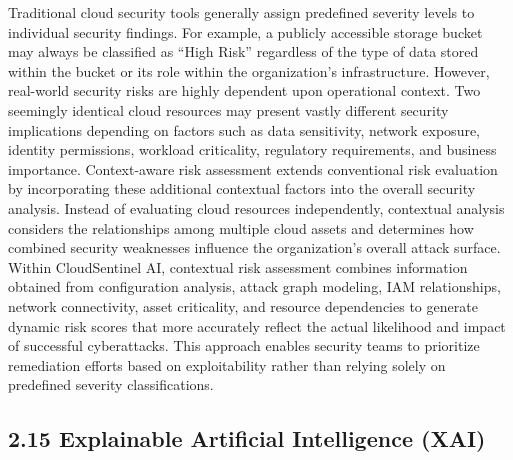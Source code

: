 Traditional cloud security tools generally assign predefined severity levels to individual security findings. For example, a publicly accessible storage bucket may always be classified as ``High Risk'' regardless of the type of data stored within the bucket or its role within the organization's infrastructure. However, real-world security risks are highly dependent upon operational context. Two seemingly identical cloud resources may present vastly different security implications depending on factors such as data sensitivity, network exposure, identity permissions, workload criticality, regulatory requirements, and business importance. Context-aware risk assessment extends conventional risk evaluation by incorporating these additional contextual factors into the overall security analysis. Instead of evaluating cloud resources independently, contextual analysis considers the relationships among multiple cloud assets and determines how combined security weaknesses influence the organization's overall attack surface. Within CloudSentinel AI, contextual risk assessment combines information obtained from configuration analysis, attack graph modeling, IAM relationships, network connectivity, asset criticality, and resource dependencies to generate dynamic risk scores that more accurately reflect the actual likelihood and impact of successful cyberattacks. This approach enables security teams to prioritize remediation efforts based on exploitability rather than relying solely on predefined severity classifications.

\subsection{2.15 Explainable Artificial Intelligence (XAI)}

